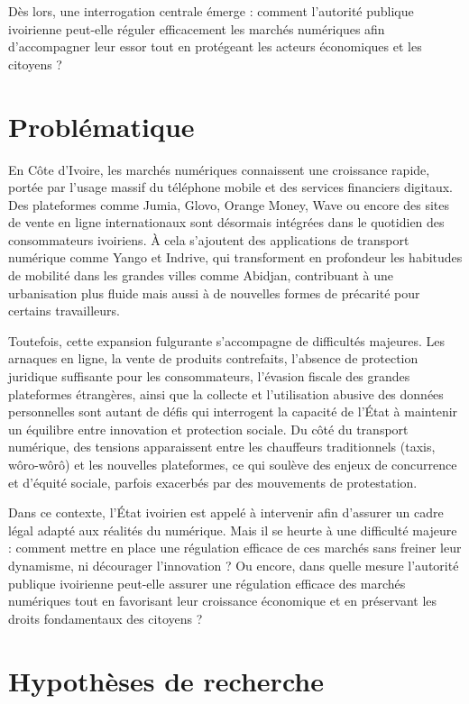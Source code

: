Dès lors, une interrogation centrale émerge : comment l'autorité publique ivoirienne peut-elle réguler efficacement les marchés numériques afin d'accompagner leur essor tout en protégeant les acteurs économiques et les citoyens ?

\section*{Problématique}

En Côte d'Ivoire, les marchés numériques connaissent une croissance rapide, portée par l'usage massif du téléphone mobile et des services financiers digitaux. Des plateformes comme Jumia, Glovo, Orange Money, Wave ou encore des sites de vente en ligne internationaux sont désormais intégrées dans le quotidien des consommateurs ivoiriens. À cela s'ajoutent des applications de transport numérique comme Yango et Indrive, qui transforment en profondeur les habitudes de mobilité dans les grandes villes comme Abidjan, contribuant à une urbanisation plus fluide mais aussi à de nouvelles formes de précarité pour certains travailleurs.

Toutefois, cette expansion fulgurante s'accompagne de difficultés majeures. Les arnaques en ligne, la vente de produits contrefaits, l'absence de protection juridique suffisante pour les consommateurs, l'évasion fiscale des grandes plateformes étrangères, ainsi que la collecte et l'utilisation abusive des données personnelles sont autant de défis qui interrogent la capacité de l'État à maintenir un équilibre entre innovation et protection sociale. Du côté du transport numérique, des tensions apparaissent entre les chauffeurs traditionnels (taxis, wôro-wôrô) et les nouvelles plateformes, ce qui soulève des enjeux de concurrence et d'équité sociale, parfois exacerbés par des mouvements de protestation.

Dans ce contexte, l'État ivoirien est appelé à intervenir afin d'assurer un cadre légal adapté aux réalités du numérique. Mais il se heurte à une difficulté majeure : comment mettre en place une régulation efficace de ces marchés sans freiner leur dynamisme, ni décourager l'innovation ? Ou encore, dans quelle mesure l'autorité publique ivoirienne peut-elle assurer une régulation efficace des marchés numériques tout en favorisant leur croissance économique et en préservant les droits fondamentaux des citoyens ?

\section*{Hypothèses de recherche}

